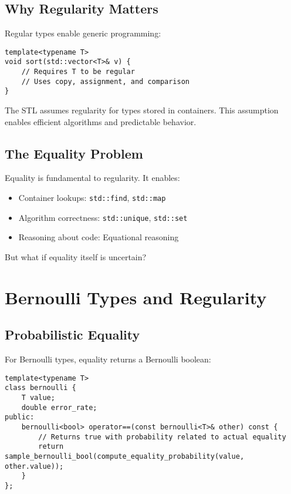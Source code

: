 \documentclass[11pt,final,hidelinks]{article}
\newcommand{\code}[1]{\texttt{#1}}
\begin{document}
\subsection{Why Regularity Matters}

Regular types enable generic programming:

\begin{verbatim}
template<typename T>
void sort(std::vector<T>& v) {
    // Requires T to be regular
    // Uses copy, assignment, and comparison
}
\end{verbatim}

The STL assumes regularity for types stored in containers. This assumption enables efficient algorithms and predictable behavior.

\subsection{The Equality Problem}

Equality is fundamental to regularity. It enables:
\begin{itemize}
    \item Container lookups: \code{std::find}, \code{std::map}
    \item Algorithm correctness: \code{std::unique}, \code{std::set}
    \item Reasoning about code: Equational reasoning
\end{itemize}

But what if equality itself is uncertain?

\section{Bernoulli Types and Regularity}

\subsection{Probabilistic Equality}

For Bernoulli types, equality returns a Bernoulli boolean:

\begin{verbatim}
template<typename T>
class bernoulli {
    T value;
    double error_rate;
public:
    bernoulli<bool> operator==(const bernoulli<T>& other) const {
        // Returns true with probability related to actual equality
        return sample_bernoulli_bool(compute_equality_probability(value, other.value));
    }
};
\end{verbatim}
\end{document}
